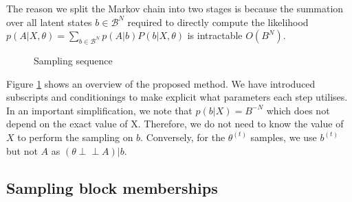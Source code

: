 \documentclass{article}
\newcommand{\Bcal}{\mathcal{B}}
\newcommand{\indep}{\perp \!\!\! \perp}
\begin{document}
The reason we split the Markov chain into two stages is because the summation over all latent states $b \in \mathcal{B}^N$ required to directly compute the likelihood $p(A| X, \theta) = \sum_{b \in \Bcal^N} p(A | b) P(b | X, \theta)$ is intractable $O(B^N)$.
%
\begin{figure}[!h]
	\centering
	\caption{Sampling sequence}
	\label{fig:samp-sequence}
\end{figure}
%
Figure \ref{fig:samp-sequence} shows an overview of the proposed method. We have introduced subscripts and conditionings to make explicit what parameters each step utilises. In an important simplification, we note that $p(b| X) = B^{-N}$ which does not depend on the exact value of X. Therefore, we do not need to know the value of $X$ to perform the sampling on $b$. Conversely, for the $\theta^{(t)}$ samples, we use $b^{(t)}$ but not $A$ as $(\theta \indep A) | b$.

\subsection{Sampling block memberships}
\end{document}
